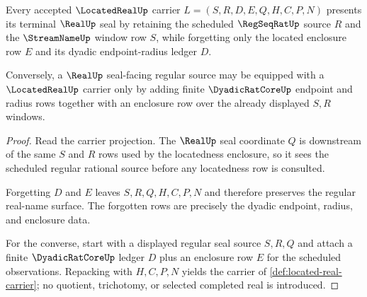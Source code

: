 \begin{theorem}
\label{thm:located-real-regular-seal}
Every accepted $\LocatedRealUp$ carrier $L=(S,R,D,E,Q,H,C,P,N)$ presents its terminal $\RealUp$ seal by retaining the scheduled $\RegSeqRatUp$ source $R$ and the $\StreamNameUp$ window row $S$, while forgetting only the located enclosure row $E$ and its dyadic endpoint-radius ledger $D$.

Conversely, a $\RealUp$ seal-facing regular source may be equipped with a $\LocatedRealUp$ carrier only by adding finite $\DyadicRatCoreUp$ endpoint and radius rows together with an enclosure row over the already displayed $S,R$ windows.
\end{theorem}
\begin{proof}
Read the carrier projection. The $\RealUp$ seal coordinate $Q$ is downstream of the same $S$ and $R$ rows used by the locatedness enclosure, so it sees the scheduled regular rational source before any locatedness row is consulted.

Forgetting $D$ and $E$ leaves $S,R,Q,H,C,P,N$ and therefore preserves the regular real-name surface. The forgotten rows are precisely the dyadic endpoint, radius, and enclosure data.

For the converse, start with a displayed regular seal source $S,R,Q$ and attach a finite $\DyadicRatCoreUp$ ledger $D$ plus an enclosure row $E$ for the scheduled observations. Repacking with $H,C,P,N$ yields the carrier of \autoref{def:located-real-carrier}; no quotient, trichotomy, or selected completed real is introduced.
\end{proof}

